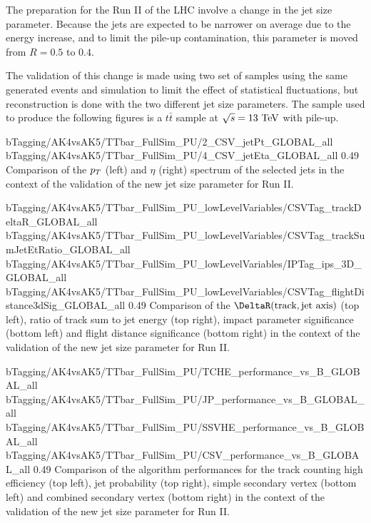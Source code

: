         The preparation for the Run II of the LHC involve a change in the jet size parameter.
        Because the jets are expected to be narrower on average due to the energy increase,
        and to limit the pile-up contamination, this parameter is moved from $R = 0.5$ to $0.4$.

        The validation of this change is made using two set of samples using the same
        generated events and simulation to limit the effect of statistical fluctuations,
        but reconstruction is done with the two different jet size parameters. The sample
        used to produce the following figures is a $t\bar{t}$ sample at $\sqrt{s} = 13~\text{TeV}$
        with pile-up.


                         {bTagging/AK4vsAK5/TTbar_FullSim_PU/2_CSV_jetPt_GLOBAL_all}
                         {bTagging/AK4vsAK5/TTbar_FullSim_PU/4_CSV_jetEta_GLOBAL_all}
                         {0.49}
                         {Comparison of the $p_T$ (left) and $\eta$ (right) spectrum of
                         the selected jets in the context of the validation of the new
                         jet size parameter for Run II.}

                          {bTagging/AK4vsAK5/TTbar_FullSim_PU_lowLevelVariables/CSVTag_trackDeltaR_GLOBAL_all}
                          {bTagging/AK4vsAK5/TTbar_FullSim_PU_lowLevelVariables/CSVTag_trackSumJetEtRatio_GLOBAL_all}
                          {bTagging/AK4vsAK5/TTbar_FullSim_PU_lowLevelVariables/IPTag_ips_3D_GLOBAL_all}
                          {bTagging/AK4vsAK5/TTbar_FullSim_PU_lowLevelVariables/CSVTag_flightDistance3dSig_GLOBAL_all}
                          {0.49}
                          {Comparison of the $\DeltaR(\text{track},\text{jet axis})$ (top left),
                          ratio of track sum to jet energy (top right), impact parameter
                          significance (bottom left) and flight distance significance (bottom
                          right) in the context of the validation of the new jet size
                          parameter for Run II.}

                          {bTagging/AK4vsAK5/TTbar_FullSim_PU/TCHE_performance_vs_B_GLOBAL_all}
                          {bTagging/AK4vsAK5/TTbar_FullSim_PU/JP_performance_vs_B_GLOBAL_all}
                          {bTagging/AK4vsAK5/TTbar_FullSim_PU/SSVHE_performance_vs_B_GLOBAL_all}
                          {bTagging/AK4vsAK5/TTbar_FullSim_PU/CSV_performance_vs_B_GLOBAL_all}
                          {0.49}
                          {Comparison of the algorithm performances for the track counting high
                          efficiency (top left), jet probability (top right), simple
                          secondary vertex (bottom left) and combined secondary vertex
                          (bottom right) in the context of the validation of the new jet size
                          parameter for Run II.}

